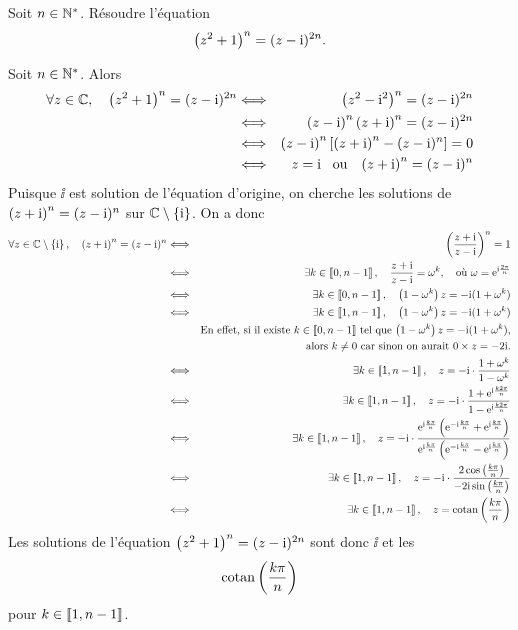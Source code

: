 \documentclass{magnolia}
\begin{document}
Soit $n\in\Ns$. Résoudre l’équation \[\p{z^2+1}^n=(z-\ii)^{2n}.\]
\begin{sol}
Soit $n\in\Ns$. Alors
\begin{eqnarray*}
\forall z\in\C\qsep \p{z^2+1}^n=(z-\ii)^{2n}
&\ssi& \p{z^2-\ii^2}^n=(z-\ii)^{2n}\\
&\ssi& \p{z-\ii}^n\p{z+\ii}^n=(z-\ii)^{2n}\\
&\ssi& \p{z-\ii}^n\cro{\p{z+\ii}^n-(z-\ii)^{n}}=0\\
&\ssi& z=\ii \ou \p{z+\ii}^n=(z-\ii)^{n}
\end{eqnarray*}
Puisque $\ii$ est solution de l'équation d'origine, on cherche les solutions de $\p{z+\ii}^n=(z-\ii)^{n}$ sur $\C\setminus\ens{\ii}$. On a donc
\begin{eqnarray*}
\forall z\in\C\setminus\ens{\ii}\qsep \p{z+\ii}^n=(z-\ii)^{n}
&\ssi& \p{\frac{z+\ii}{z-\ii}}^n=1\\
&\ssi& \exists k\in\intere{0}{n-1}\qsep \frac{z+\ii}{z-\ii}=\omega^k, \quad\text{où $\omega=\e^{\ii\frac{2\pi}{n}}$}\\
&\ssi& \exists k\in\intere{0}{n-1}\qsep \p{1-\omega^k}z=-\ii(1+\omega^k)\\
&\ssi& \exists k\in\intere{1}{n-1}\qsep \p{1-\omega^k}z=-\ii(1+\omega^k)\\
&    & \text{En effet, si il existe $k\in\intere{0}{n-1}$ tel que $\p{1-\omega^k}z=-\ii(1+\omega^k)$,}\\
&    & \text{alors $k\neq 0$ car sinon on aurait $0\times z=-2\ii$.}\\
&\ssi& \exists k\in\intere{1}{n-1}\qsep z=-\ii\cdot\frac{1+\omega^k}{1-\omega^k}\\
&\ssi& \exists k\in\intere{1}{n-1}\qsep z=-\ii\cdot\frac{1+\e^{\ii\frac{k2\pi}{n}}}{1-\e^{\ii\frac{k2\pi}{n}}}\\
&\ssi& \exists k\in\intere{1}{n-1}\qsep z=-\ii\cdot\frac{\e^{\ii\frac{k\pi}{n}}\p{\e^{-\ii\frac{k\pi}{n}}+\e^{\ii\frac{k\pi}{n}}}}{\e^{\ii\frac{k\pi}{n}}\p{\e^{-\ii\frac{k\pi}{n}}-\e^{\ii\frac{k\pi}{n}}}}\\
&\ssi& \exists k\in\intere{1}{n-1}\qsep z=-\ii\cdot\frac{2\cos\p{\frac{k\pi}{n}}}{-2\ii\sin\p{\frac{k\pi}{n}}}\\
&\ssi& \exists k\in\intere{1}{n-1}\qsep z=\cotan\p{\frac{k\pi}{n}}
\end{eqnarray*}
Les solutions de l'équation $\p{z^2+1}^n=(z-\ii)^{2n}$ sont donc $\ii$ et les
\[\cotan\p{\frac{k\pi}{n}}\]
pour $k\in\intere{1}{n-1}$.
\end{sol}
\end{document}
